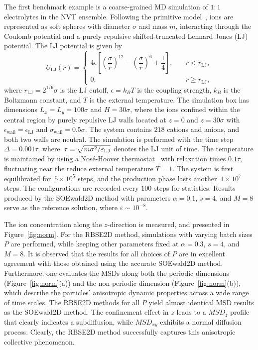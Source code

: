 The first benchmark example is a coarse-grained MD simulation of  $1:1$ electrolytes in the NVT ensemble. 
Following the primitive model~\cite{frenkel2023understanding}, ions are represented as soft spheres with diameter $\sigma$ and mass $m$, interacting through the Coulomb potential and a purely repulsive shifted-truncated Lennard Jones (LJ) potential. 
The LJ potential is given by
\begin{equation}
	U_{\text{LJ}}(r) = 
	\begin{cases}
		4 \epsilon \left[ \left(\dfrac{\sigma}{r}\right)^{12}-\left(\dfrac{\sigma}{r}\right)^6 + \dfrac{1}{4}\right],\quad & r < r_{\text{LJ}}, \\
		0, & r \geq r_{\text{LJ}},
	\end{cases}
\end{equation}
where $r_{\text{LJ}} = 2^{1/6} \sigma$ is the LJ cutoff, $\epsilon = k_B T$ is the coupling strength, $k_B$ is the Boltzmann constant, and $T$ is the external temperature. 
The simulation box has dimensions $L_x = L_y = 100 \sigma$ and $H = 30 \sigma$, where the ions confined within the central region by purely repulsive LJ walls located at $z = 0$ and $z = 30 \sigma$ with $\epsilon_{\text{wall}} = \epsilon_{\text{LJ}}$ and $\sigma_{\text{wall}} = 0.5 \sigma$. 
The system contains $218$ cations and anions, and both two walls are neutral. 
The simulation is performed with the time step~$\Delta=0.001\tau$, where~$\tau = \sqrt{m \sigma^2 / \varepsilon_{\text{LJ}}}$ denotes the LJ unit of time. 
The temperature is maintained by using a Nos\'e-Hoover thermostat~\cite{frenkel2023understanding} with relaxation times $0.1\tau$, fluctuating near the reduce external temperature $T=1$.
The system is first equilibrated for~$5 \times 10^5$ steps, and the production phase lasts another~$1 \times 10^7$ steps. 
The configurations are recorded every $100$ steps for statistics. Results produced by the SOEwald2D method with parameters $\alpha=0.1$, $s=4$, and $M=8$ serve as the reference solution, where $\varepsilon\sim 10^{-8}$.

The ion concentration along the $z$-direction is measured, and presented in Figure~\ref{fig:norm}. 
For the RBSE2D method, simulations with varying batch sizes $P$ are performed, while keeping other parameters fixed at $\alpha = 0.3$, $s=4$, and $M=8$. 
It is observed that the results for all choices of $P$ are in excellent agreement with those obtained using the accurate SOEwald2D method. 
Furthermore, one evaluates the MSDs along both the periodic dimensions (Figure~\ref{fig:norm}(a)) and the non-periodic dimension (Figure~\ref{fig:norm}(b)), which describe the particles' anisotropic dynamic properties across a wide range of time scales. 
The RBSE2D methods for all $P$ yield almost identical MSD results as the SOEwald2D method. 
The confinement effect in $z$ leads to a $MSD_z$ profile that clearly indicates a subdiffusion, while $MSD_{xy}$ exhibits a normal diffusion process. 
Clearly, the RBSE2D method successfully captures this anisotropic collective phenomenon.


